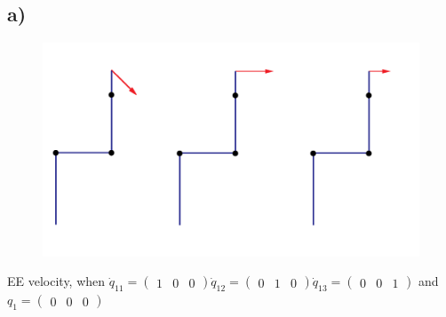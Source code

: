 \documentclass[a4paper,10pt]{article}
\begin{document}
\subsection*{a)}
\begin{figure}[H]
	\begin{center}
		\includegraphics[scale=0.3]{img/1_full.png}
	\end{center}
\end{figure}
EE velocity, when 
$
\dot{q}_{11} =
\begin{pmatrix}
1 & 0 & 0
\end{pmatrix}
\dot{q}_{12} =
\begin{pmatrix}
0 & 1 & 0
\end{pmatrix}
\dot{q}_{13} =
\begin{pmatrix}
0 & 0 & 1
\end{pmatrix}
$
and  
$
q_1=
\begin{pmatrix}
	0 & 0 & 0
\end{pmatrix} 
$
\\~\\
\end{document}
